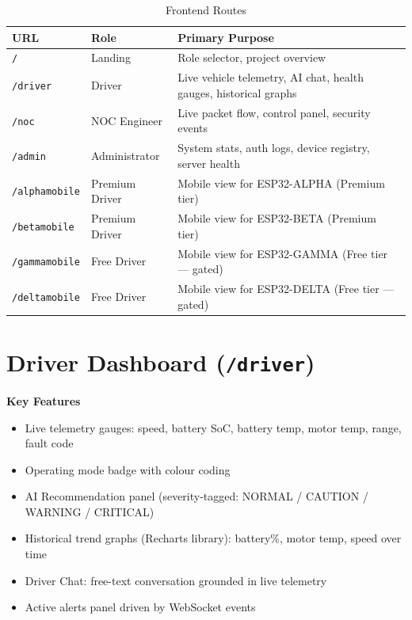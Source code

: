 \documentclass[12pt,a4paper]{report}
\newenvironment{ccnsbox}[1]{%
  \begin{mdframed}[backgroundcolor=cvislightbg,
    linecolor=cvisblue,linewidth=1.5pt,
    innerleftmargin=10pt,innerrightmargin=10pt,
    innertopmargin=6pt,innerbottommargin=6pt]
  \textbf{\color{cvisblue}#1}\par\smallskip}
  {\end{mdframed}}
\begin{document}
\begin{table}[H]
\centering
\caption{Frontend Routes}
\label{tab:routes}
\begin{tabularx}{\textwidth}{L{3.5cm} L{2.5cm} X}
\toprule
\textbf{URL} & \textbf{Role} & \textbf{Primary Purpose} \\
\midrule
\texttt{/} & Landing & Role selector, project overview \\
\texttt{/driver} & Driver & Live vehicle telemetry, AI chat, health gauges, historical graphs \\
\texttt{/noc} & NOC Engineer & Live packet flow, control panel, security events \\
\texttt{/admin} & Administrator & System stats, auth logs, device registry, server health \\
\texttt{/alphamobile} & Premium Driver & Mobile view for ESP32-ALPHA (Premium tier) \\
\texttt{/betamobile} & Premium Driver & Mobile view for ESP32-BETA (Premium tier) \\
\texttt{/gammamobile} & Free Driver & Mobile view for ESP32-GAMMA (Free tier — gated) \\
\texttt{/deltamobile} & Free Driver & Mobile view for ESP32-DELTA (Free tier — gated) \\
\bottomrule
\end{tabularx}
\end{table}

\section{Driver Dashboard (\texttt{/driver})}

\begin{ccnsbox}{Key Features}
\begin{itemize}[nosep]
  \item Live telemetry gauges: speed, battery SoC, battery temp, motor temp, range, fault code
  \item Operating mode badge with colour coding
  \item AI Recommendation panel (severity-tagged: NORMAL / CAUTION / WARNING / CRITICAL)
  \item Historical trend graphs (Recharts library): battery\%, motor temp, speed over time
  \item Driver Chat: free-text conversation grounded in live telemetry
  \item Active alerts panel driven by WebSocket events
\end{itemize}
\end{ccnsbox}
\end{document}
